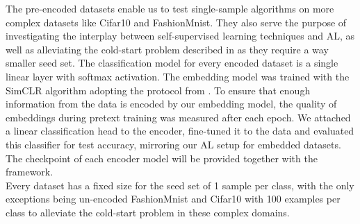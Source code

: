\documentclass[]{article}
\begin{document}
The pre-encoded datasets enable us to test single-sample algorithms on more complex datasets like Cifar10 and FashionMnist.
They also serve the purpose of investigating the interplay between self-supervised learning techniques and AL, as well as alleviating the cold-start problem described in \cite{luth2024navigating} as they require a way smaller seed set.
The classification model for every encoded dataset is a single linear layer with softmax activation.
The embedding model was trained with the SimCLR \cite{chen2020simple} algorithm adopting the protocol from \cite{hacohen2022active}. 
To ensure that enough information from the data is encoded by our embedding model, the quality of embeddings during pretext training was measured after each epoch.
We attached a linear classification head to the encoder, fine-tuned it to the data and evaluated this classifier for test accuracy, mirroring our AL setup for embedded datasets. 
The checkpoint of each encoder model will be provided together with the framework. \\ [1mm]
Every dataset has a fixed size for the seed set of 1 sample per class, with the only exceptions being un-encoded FashionMnist and Cifar10 with 100 examples per class to alleviate the cold-start problem in these complex domains. 
\end{document}
